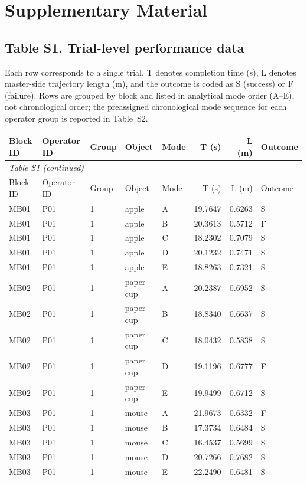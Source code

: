 \documentclass[11pt]{article}
\begin{document}
\section*{Supplementary Material}
\subsection*{Table S1. Trial-level performance data}
Each row corresponds to a single trial. T denotes completion time (s), L denotes master-side trajectory length (m), and the outcome is coded as S (success) or F (failure). Rows are grouped by block and listed in analytical mode order (A--E), not chronological order; the preassigned chronological mode sequence for each operator group is reported in Table~S2.
\scriptsize
\begin{longtable}{lll llrrl}
\toprule
Block ID & Operator ID & Group & Object & Mode & T (s) & L (m) & Outcome \\
\midrule
\endfirsthead
\multicolumn{8}{l}{\textit{Table S1 (continued)}} \\
\toprule
Block ID & Operator ID & Group & Object & Mode & T (s) & L (m) & Outcome \\
\midrule
\endhead
MB01 & P01 & 1 & apple & A & 19.7647 & 0.6263 & S \\
MB01 & P01 & 1 & apple & B & 20.3613 & 0.5712 & F \\
MB01 & P01 & 1 & apple & C & 18.2302 & 0.7079 & S \\
MB01 & P01 & 1 & apple & D & 20.1232 & 0.7471 & S \\
MB01 & P01 & 1 & apple & E & 18.8263 & 0.7321 & S \\
MB02 & P01 & 1 & paper cup & A & 20.2387 & 0.6952 & S \\
MB02 & P01 & 1 & paper cup & B & 18.8340 & 0.6637 & S \\
MB02 & P01 & 1 & paper cup & C & 18.0432 & 0.5838 & S \\
MB02 & P01 & 1 & paper cup & D & 19.1196 & 0.6777 & F \\
MB02 & P01 & 1 & paper cup & E & 19.9499 & 0.6712 & S \\
MB03 & P01 & 1 & mouse & A & 21.9673 & 0.6332 & F \\
MB03 & P01 & 1 & mouse & B & 17.3734 & 0.6484 & S \\
MB03 & P01 & 1 & mouse & C & 16.4537 & 0.5699 & S \\
MB03 & P01 & 1 & mouse & D & 20.7266 & 0.7682 & S \\
MB03 & P01 & 1 & mouse & E & 22.2490 & 0.6481 & S \\

\end{longtable}
\end{document}
